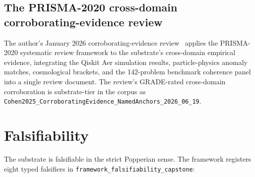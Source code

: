 \documentclass[11pt,a4paper]{amsart}
\theoremstyle{plain}
\theoremstyle{definition}
\begin{document}
\subsection{The PRISMA-2020 cross-domain corroborating-evidence review}

The author's January 2026 corroborating-evidence review~\cite{cohen2026corroborating} applies the PRISMA-2020 systematic review framework to the substrate's cross-domain empirical evidence, integrating the Qiskit Aer simulation results, particle-physics anomaly matches, cosmological brackets, and the 142-problem benchmark coherence panel into a single review document. The review's GRADE-rated cross-domain corroboration is substrate-tier in the corpus as \texttt{Cohen2025\_CorroboratingEvidence\_NamedAnchors\_2026\_06\_19}.

\section{Falsifiability}\label{sec:falsifiers}

The substrate is falsifiable in the strict Popperian sense. The framework registers eight typed falsifiers in \texttt{framework\_falsifiability\_capstone}:
\end{document}

